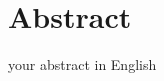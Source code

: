 \thispagestyle{empty}
\vspace{-3cm}
\section*{\centering Abstract}
your abstract in English
\noindent


